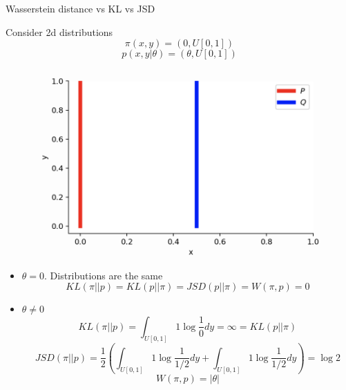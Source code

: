 \begin{frame}{Wasserstein distance vs KL vs JSD}
	
	\begin{minipage}[t]{0.48\columnwidth}
		\vspace{0.1cm}
		Consider 2d distributions
		\[
			\pi(x, y) = (0, U[0,1])
		\]	
		\[
			p(x, y | \theta) = (\theta, U[0, 1])
		\]
	\end{minipage}%
	\begin{minipage}[t]{0.52\columnwidth}
		\begin{figure}
			\centering
			\includegraphics[width=0.8\linewidth]{figs/w_kl_jsd}
		\end{figure}
	\end{minipage}
	\begin{itemize}
		\footnotesize
		\item $\theta = 0$.
		Distributions are the same 
		\[
			KL(\pi || p) = KL(p || \pi) = JSD(p || \pi) = W(\pi, p) = 0
		\]
		\item $\theta \neq 0$
		\[
			KL(\pi || p) = \int_{U[0, 1]} 1 \log \frac{1}{0} d y = \infty = KL(p || \pi)
		\]
		\[
			JSD(\pi || p) = \frac{1}{2}\left( \int_{U[0, 1]}1 \log \frac{1}{1/2} dy + \int_{U[0, 1]}1 \log \frac{1}{1/2} dy \right) = \log 2
		\]
		\[
			W(\pi, p) = |\theta|
		\]
	\end{itemize}
	
\end{frame}
